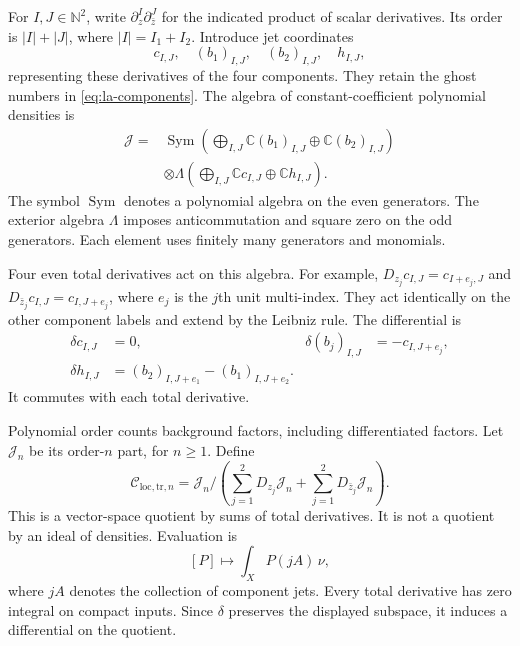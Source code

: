 For $I,J\in\mathbb N^2$, write
$\partial_z^I\partial_{\bar z}^J$
for the indicated product of scalar derivatives. Its order is
$|I|+|J|$, where $|I|=I_1+I_2$.
Introduce jet coordinates
\[
 c_{I,J},\quad (b_1)_{I,J},\quad (b_2)_{I,J},\quad h_{I,J},
\]
representing these derivatives of the four components.
They retain the ghost numbers in \eqref{eq:la-components}.
The algebra of constant-coefficient polynomial densities is
\begin{equation}\label{eq:la-jet-algebra}
 \begin{split}
 \mathcal J={}&
 \operatorname{Sym}\left(
    \bigoplus_{I,J}\mathbb C(b_1)_{I,J}
          \oplus\mathbb C(b_2)_{I,J}\right)\\
 &\otimes
 \Lambda\left(\bigoplus_{I,J}\mathbb Cc_{I,J}
                      \oplus\mathbb Ch_{I,J}\right).
 \end{split}
\end{equation}
The symbol $\operatorname{Sym}$ denotes a polynomial algebra on
the even generators. The exterior algebra $\Lambda$ imposes
anticommutation and square zero on the odd generators.
Each element uses finitely many generators and monomials.

Four even total derivatives act on this algebra. For example,
$D_{z_j}c_{I,J}=c_{I+e_j,J}$ and
$D_{\bar z_j}c_{I,J}=c_{I,J+e_j}$, where $e_j$ is the $j$th
unit multi-index. They act identically on the other component
labels and extend by the Leibniz rule. The differential is
\begin{equation}\label{eq:la-jet-differential}
 \begin{aligned}
 \delta c_{I,J}&=0,&
 \delta(b_j)_{I,J}&=-c_{I,J+e_j},\\
 \delta h_{I,J}&=(b_2)_{I,J+e_1}-(b_1)_{I,J+e_2}.
 \end{aligned}
\end{equation}
It commutes with each total derivative.

Polynomial order counts background factors, including
differentiated factors. Let $\mathcal J_n$ be its order-$n$
part, for $n\geq1$. Define
\begin{equation}\label{eq:la-local-tr}
 \mathcal C_{\mathrm{loc,tr},n}
 =\mathcal J_n\Big/
  \left(\sum_{j=1}^2D_{z_j}\mathcal J_n
             +\sum_{j=1}^2D_{\bar z_j}\mathcal J_n\right).
\end{equation}
This is a vector-space quotient by sums of total derivatives.
It is not a quotient by an ideal of densities. Evaluation is
\[
 [P]\longmapsto \int_X P(jA)\,\nu,
\]
where $jA$ denotes the collection of component jets.
Every total derivative has zero integral on compact inputs.
Since $\delta$ preserves the displayed subspace, it induces a
differential on the quotient.

